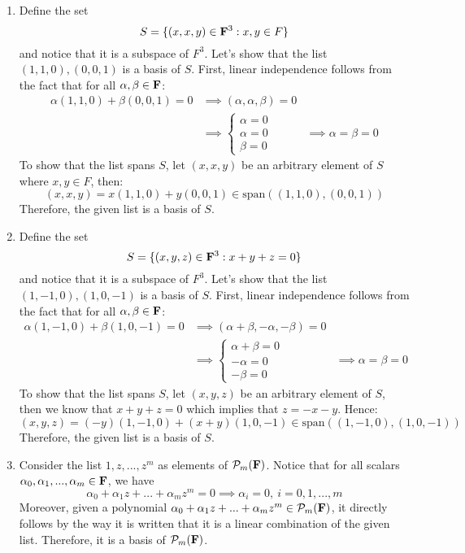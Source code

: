 \begin{solution}
\begin{enumerate}[label=(\alph*)]
        \item Define the set
        $$S = \{(x,x,y) \in \mathbf{F}^3: x,y \in F\}$$
        and notice that it is a subspace of $F^3$. Let's show that the list $(1,1,0), (0,0,1)$ is a basis of $S$. First, linear independence follows from the fact that for all $\alpha, \beta \in \mathbf{F}$:
        \begin{align*}
            \alpha (1,1,0) + \beta(0,0,1) = 0 &\implies (\alpha, \alpha, \beta) = 0 \\
            &\implies \begin{cases}
                \alpha = 0 \\ \alpha = 0 \\ \beta = 0
            \end{cases}
            &\implies \alpha = \beta = 0
        \end{align*}
        To show that the list spans $S$, let $(x,x,y)$ be an arbitrary element of $S$ where $x,y \in F$, then:
        $$(x,x,y) = x(1,1,0) + y(0,0,1) \in \text{span}((1,1,0), (0,0,1))$$
        Therefore, the given list is a basis of $S$.
        \item Define the set
        $$S = \{(x,y,z) \in \mathbf{F}^3: x + y + z = 0\}$$
        and notice that it is a subspace of $F^3$. Let's show that the list $(1,-1,0), (1,0,-1)$ is a basis of $S$. First, linear independence follows from the fact that for all $\alpha, \beta \in \mathbf{F}$:
        \begin{align*}
            \alpha (1,-1,0) + \beta(1,0,-1) = 0 &\implies (\alpha + \beta, -\alpha, -\beta) = 0 \\
            &\implies \begin{cases}
                \alpha + \beta = 0 \\ -\alpha = 0 \\ -\beta = 0
            \end{cases}
            &\implies \alpha = \beta = 0
        \end{align*}
        To show that the list spans $S$, let $(x,y,z)$ be an arbitrary element of $S$, then we know that $x + y + z = 0$ which implies that $z = -x-y$. Hence:
        $$(x,y,z) = (-y)(1, -1, 0) + (x+y)(1, 0, -1) \in \text{span}((1, -1, 0), (1, 0, -1))$$
        Therefore, the given list is a basis of $S$.
        \item Consider the list $1, z, ..., z^m$ as elements of $\mathcal{P}_m(\mathbf{F})$. Notice that for all scalars $\alpha_0, \alpha_1, ..., \alpha_m \in \mathbf{F}$, we have
        $$\alpha_0 + \alpha_1z + ... + \alpha_m z^m = 0 \implies \alpha_i = 0, \ i=0,1,..., m$$
        Moreover, given a polynomial $\alpha_0 + \alpha_1z + ... + \alpha_m z^m \in \mathcal{P}_m(\mathbf{F})$, it directly follows by the way it is written that it is a linear combination of the given list. Therefore, it is a basis of $\mathcal{P}_m(\mathbf{F})$.\\
    \end{enumerate}
\end{solution}

